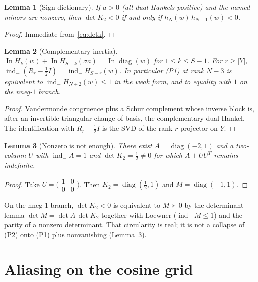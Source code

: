\documentclass[11pt]{article}
\newtheorem{lemma}{Lemma}
\theoremstyle{remark}
\newcommand{\indm}{\operatorname{ind}_{-}}
\newcommand{\In}{\operatorname{In}}
\begin{document}
\begin{lemma}[Sign dictionary]\label{lem:sign}
If $a>0$ (all dual Hankels positive) and the named minors are
nonzero, then $\det K_2<0$ if and only if $h_N(w)\,h_{N+1}(w)<0$.
\end{lemma}

\begin{proof}
Immediate from~\eqref{eq:detk}.
\end{proof}

\begin{lemma}[Complementary inertia]\label{lem:iner}
$\In H_k(w)+\In H_{S-k}(\sigma a)=\In\operatorname{diag}(w)$
for $1\le k\le S-1$.  For $r\ge |Y|$,
$\indm(R_r-\tfrac12 I)=\indm H_{S-r}(w)$.  In particular
(P1) at rank $N-3$ is equivalent to $\indm H_{N+2}(w)\le 1$
in the weak form, and to equality with $1$ on the nneg-$1$
branch.
\end{lemma}

\begin{proof}
Vandermonde congruence plus a Schur complement whose inverse
block is, after an invertible triangular change of basis, the
complementary dual Hankel.  The identification with
$R_r-\tfrac12 I$ is the SVD of the rank-$r$ projector on $Y$.
\end{proof}

\begin{lemma}[Nonzero is not enough]\label{lem:adv}
There exist $A=\operatorname{diag}(-2,1)$ and a two-column $U$
with $\indm A=1$ and $\det K_2=\tfrac12\neq 0$ for which
$A+UU^T$ remains indefinite.
\end{lemma}

\begin{proof}
Take $U=\bigl(\begin{smallmatrix}1&0\\0&0\end{smallmatrix}\bigr)$.
Then $K_2=\operatorname{diag}(\tfrac12,1)$ and
$M=\operatorname{diag}(-1,1)$.
\end{proof}

On the nneg-$1$ branch, $\det K_2<0$ is equivalent to
$M\succ 0$ by the determinant lemma $\det M=\det A\,\det K_2$
together with Loewner ($\indm M\le 1$) and the parity of a
nonzero determinant.  That circularity is real; it is not a
collapse of (P2) onto (P1) plus nonvanishing
(Lemma~\ref{lem:adv}).

\section{Aliasing on the cosine grid}\label{sec:alias}
\end{document}
